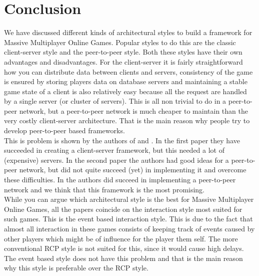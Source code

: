 \section*{Conclusion}
We have discussed different kinds of architectural styles to build a framework for Massive Multiplayer Online Games. 
Popular styles to do this are the classic client-server style and the peer-to-peer style. 
Both these styles have their own advantages and disadvantages. 
For the client-server it is fairly straightforward how you can distribute data between clients and servers, consistency of the game is ensured by storing players data on database servers and maintaining a stable game state of a client is also relatively easy because all the request are handled by a single server (or cluster of servers). 
This is all non trivial to do in a peer-to-peer network, but a peer-to-peer network is much cheaper to maintain than the very costly client-server architecture. 
That is the main reason why people try to develop peer-to-peer based frameworks.\\
This is problem is shown by the authors of \cite{middleware} and \cite{peer}.
In the first paper they have succeeded in creating a client-server framework, but this needed a lot of (expensive) servers. 
In the second paper the authors had good ideas for a peer-to-peer network, but did not quite succeed (yet) in implementing it and overcome these difficulties.
In \cite{service} the authors did succeed in implementing a peer-to-peer network and we think that this framework is the most promising.\\
While you can argue which architectural style is the best for Massive Multiplayer Online Games, all the papers coincide on the interaction style most suited for such games.
This is the event based interaction style. 
This is due to the fact that almost all interaction in these games consists of keeping track of events caused by other players which might be of influence for the player them self.
The more conventional RCP style is not suited for this, since it would cause high delays. 
The event based style does not have this problem and that is the main reason why this style is preferable over the RCP style.
